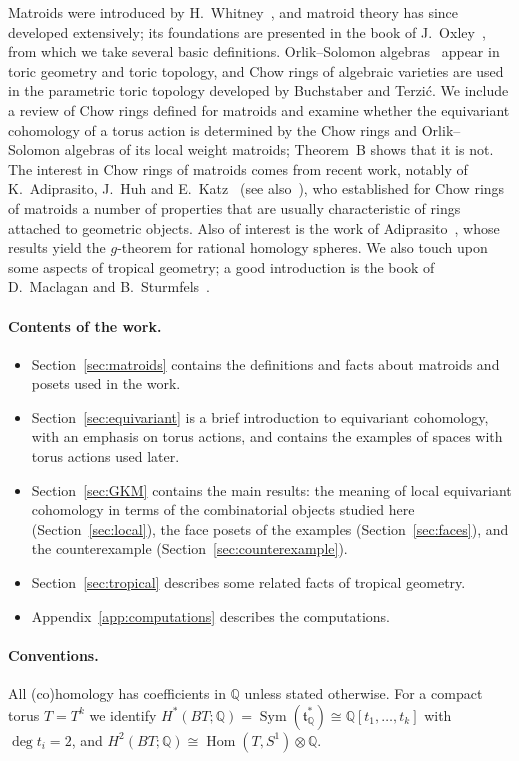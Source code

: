 \documentclass[11pt,a4paper]{article}
\numberwithin{equation}{section}
\theoremstyle{plain}
\theoremstyle{definition}
\theoremstyle{remark}
\newcommand{\Q}{\mathbb{Q}}
\DeclareMathOperator{\Sym}{Sym}
\DeclareMathOperator{\Hom}{Hom}
\begin{document}
Matroids were introduced by H.~Whitney~\cite{Whi35}, and matroid theory has since developed extensively; its foundations are presented in the book of J.~Oxley~\cite{Oxl11}, from which we take several basic definitions. Orlik--Solomon algebras~\cite{OT92} appear in toric geometry and toric topology, and Chow rings of algebraic varieties are used in the parametric toric topology developed by Buchstaber and Terzić. We include a review of Chow rings defined for matroids and examine whether the equivariant cohomology of a torus action is determined by the Chow rings and Orlik--Solomon algebras of its local weight matroids; Theorem~B shows that it is not. The interest in Chow rings of matroids comes from recent work, notably of K.~Adiprasito, J.~Huh and E.~Katz~\cite{AHK18} (see also~\cite{Huh14}), who established for Chow rings of matroids a number of properties that are usually characteristic of rings attached to geometric objects. Also of interest is the work of Adiprasito~\cite{Adi18}, whose results yield the $g$-theorem for rational homology spheres. We also touch upon some aspects of tropical geometry; a good introduction is the book of D.~Maclagan and B.~Sturmfels~\cite{MS15}.

\paragraph{Contents of the work.}
\begin{itemize}[nosep]
\item Section~\ref{sec:matroids} contains the definitions and facts about matroids and posets used in the work.
\item Section~\ref{sec:equivariant} is a brief introduction to equivariant cohomology, with an emphasis on torus actions, and contains the examples of spaces with torus actions used later.
\item Section~\ref{sec:GKM} contains the main results: the meaning of local equivariant cohomology in terms of the combinatorial objects studied here (Section~\ref{sec:local}), the face posets of the examples (Section~\ref{sec:faces}), and the counterexample (Section~\ref{sec:counterexample}).
\item Section~\ref{sec:tropical} describes some related facts of tropical geometry.
\item Appendix~\ref{app:computations} describes the computations.
\end{itemize}

\paragraph{Conventions.}
All (co)homology has coefficients in $\Q$ unless stated otherwise. For a compact torus $T=T^k$ we identify $H^*(BT;\Q)=\Sym(\mathfrak t^*_\Q)\cong\Q[t_1,\dots,t_k]$ with $\deg t_i=2$, and $H^2(BT;\Q)\cong\Hom(T,S^1)\otimes\Q$.
\end{document}

